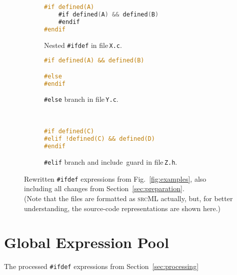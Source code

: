\documentclass[a4paper]{scrartcl}
\newcommand\code[1]{\texttt{#1}}
\newcommand\tool[1]{\textsc{#1}}
\newcommand\ifdeff[1]{\code{\##1}\xspace}
\newcommand\ifdef[0]{{\upshape\ifdeff{ifdef}}\xspace}
\begin{document}
\begin{figure}[ht]
        \centering
        \begin{subfigure}[t]{\textwidth}
					\begin{lstlisting}[language=C]
#if defined(A)
	#if defined(A) && defined(B)
	#endif
#endif
					\end{lstlisting}
					\caption{Nested \ifdef in file\,\code{X.c}.\vspace{1em}}
					\label{fig:examples2:a}
        \end{subfigure}
        \vspace{1em}
        \begin{subfigure}[t]{\textwidth}
					\begin{lstlisting}[language=C, firstnumber=5]
#if defined(A) && defined(B)

#else 
#endif
					\end{lstlisting}
					\caption{\ifdeff{else} branch in file\,\code{Y.c}.}
					\label{fig:examples2:b}
        \end{subfigure}
        \begin{subfigure}[t]{\textwidth}
					\begin{lstlisting}[language=C, firstnumber=8]


#if defined(C)
#elif !defined(C) && defined(D)
#endif

					\end{lstlisting}
					\caption{\ifdeff{elif} branch and include~guard in file\,\code{Z.h}.}
					\label{fig:examples2:c}
        \end{subfigure}     
        
        \caption{Rewritten \ifdef expressions from Fig.\ \ref{fig:examples}, also including all changes from Section~\ref{sec:preparation}.\\
        				{\footnotesize (Note that the files are formatted as \tool{srcML} actually, but, for better understanding, the source-code representations are shown here.)}}
        \label{fig:examples2}
\end{figure}



\section{Global Expression Pool}
\label{sec:pool}

The processed \ifdef expressions from Section~\ref{sec:processing}




\end{document}
